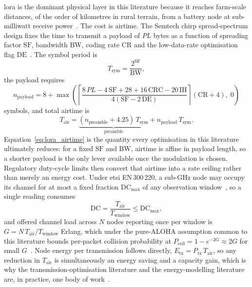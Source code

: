 \gls{lora} is the dominant physical layer in this literature because it
reaches farm-scale distances, of the order of kilometres in rural terrain,
from a battery node at sub-milliwatt receive
power~\cite{raza2018lorawan, li2020performance, raj2017comprehensive}. The
cost is airtime. The Semtech chirp spread-spectrum design fixes the time to
transmit a payload of $PL$ bytes as a function of spreading factor $\mathrm{SF}$,
bandwidth $\mathrm{BW}$, coding rate $\mathrm{CR}$ and the low-data-rate
optimisation flag $\mathrm{DE}$~\cite{semtech2015lorawan, bor2016lorawan}.
The symbol period is
\begin{equation}
T_{\text{sym}} = \frac{2^{\mathrm{SF}}}{\mathrm{BW}},
\label{eq:lora_symbol}
\end{equation}
the payload requires
\begin{equation}
n_{\text{payload}} = 8 + \max\!\left(
  \left\lceil \frac{8\,PL - 4\,\mathrm{SF} + 28 + 16\,\mathrm{CRC} - 20\,\mathrm{IH}}
                    {4(\mathrm{SF} - 2\,\mathrm{DE})} \right\rceil
  (\mathrm{CR}+4),\; 0 \right)
\label{eq:lora_payload_symbols}
\end{equation}
symbols, and total airtime is
\begin{equation}
T_{\text{air}} = \underbrace{(n_{\text{preamble}} + 4.25)\, T_{\text{sym}}}_{\text{preamble}}
               + n_{\text{payload}} \, T_{\text{sym}}.
\label{eq:lora_airtime}
\end{equation}
Equation~\ref{eq:lora_airtime} is the quantity every optimisation in this
literature ultimately reduces: for a fixed $\mathrm{SF}$ and $\mathrm{BW}$,
airtime is affine in payload length, so a shorter payload is the only lever
available once the modulation is chosen. Regulatory duty-cycle limits then
convert that airtime into a rate ceiling rather than merely an energy cost.
Under \gls{etsi} EN\,300\,220, a sub-GHz node may occupy its channel for at
most a fixed fraction $\mathrm{DC}_{\max}$ of any observation
window~\cite{ttn2024eu868, loraalliance2021regional}, so a single reading
consumes
\begin{equation}
\mathrm{DC} = \frac{T_{\text{air}}}{T_{\text{window}}} \leq \mathrm{DC}_{\max},
\label{eq:duty_cycle}
\end{equation}
and offered channel load across $N$ nodes reporting once per window is
$G = N\,T_{\text{air}}/T_{\text{window}}$ Erlang, which under the pure-ALOHA
assumption common to this literature bounds per-packet collision probability
at $P_{\text{coll}} = 1 - e^{-2G} \approx 2G$ for small
$G$~\cite{bor2016lorawan, adelantado2017understanding}. Node energy per
transmission follows directly, $E_{\text{tx}} = P_{\text{tx}}\,T_{\text{air}}$,
so any reduction in $T_{\text{air}}$ is simultaneously an energy saving and a
capacity gain, which is why the transmission-optimisation literature and the
energy-modelling literature are, in practice, one
body of work~\cite{barr1994energy, polastre2005versatile, gonzalez2000energy, mohammed2025loraEnergy, sanchez2021energy, heinzelman2000energy}.

